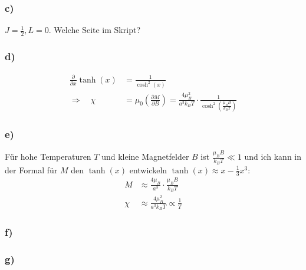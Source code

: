 \subsubsection*{c)}
$J = \frac{1}{2}, L = 0$. Welche Seite im Skript?

\subsubsection*{d)}
\begin{align*}
  \frac{\partial}{\partial x} \tanh(x) &= \frac{1}{\cosh^2 (x)} \\
  \Rightarrow \quad \chi &= \mu_0 \left(\frac{\partial M}{\partial B}\right) =
  \frac{4 \mu_B^2}{a^3 k_B T} \cdot \frac{1}{\cosh^2\left(\frac{\mu_B B}{k_B T}\right)}
\end{align*}

\subsubsection*{e)}
Für hohe Temperaturen $T$ und kleine Magnetfelder $B$ ist $\frac{\mu_B B}{k_B T} \ll 1$
und ich kann in der Formal für $M$ den $\tanh(x)$ entwickeln $\tanh(x) \approx x - \frac{1}{3}x^3$:
\begin{align*}
  M &\approx \frac{4 \mu_B}{a^3} \cdot \frac{\mu_B B}{k_B T}\\
  \chi &\approx \frac{4 \mu_B^2}{a^3 k_B T} \propto \frac{1}{T}
\end{align*}



\subsubsection*{f)}

\subsubsection*{g)}
